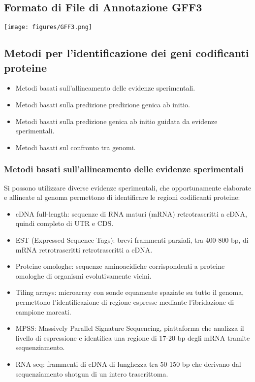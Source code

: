\documentclass{article}
\begin{document}
\subsection{Formato di File di Annotazione GFF3}
\begin{center}
    \texttt{[image: figures/GFF3.png]}
\end{center}
\subsection{Metodi per l'identificazione dei geni codificanti proteine}
\begin{itemize}
    \item Metodi basati sull'allineamento delle evidenze sperimentali.
    \item Metodi basati sulla predizione predizione genica ab
    initio.
    \item Metodi basati sulla predizione genica ab
    initio guidata da evidenze sperimentali.
    \item Metodi basati sul confronto tra genomi.
\end{itemize}

\subsubsection{Metodi basati sull'allineamento delle evidenze sperimentali}
Si possono utilizzare diverse evidenze sperimentali, che
opportunamente elaborate e allineate al genoma
permettono di identificare le regioni codificanti proteine:
\begin{itemize}
    \item cDNA full-length: sequenze di RNA maturi (mRNA)
    retrotrascritti a cDNA, quindi completo di UTR e CDS.
    \item EST (Expressed Sequence Tags): brevi frammenti parziali, tra
    400-800 bp, di mRNA retrotrascritti retrotrascritti a cDNA. 
    \item Proteine omologhe: sequenze aminoacidiche corrispondenti a
    proteine omologhe di organismi evolutivamente vicini.
    \item Tiling arrays: microarray con sonde equamente spaziate su
    tutto il genoma, permettono l'identificazione di regione
    espresse mediante l'ibridazione di campione marcati.
    \item MPSS: Massively Parallel Signature Sequencing, piattaforma
    che analizza il livello di espressione e identifica una regione di
    17-20 bp degli mRNA tramite sequenziamento.
    \item RNA-seq: frammenti di cDNA di lunghezza tra 50-150 bp che
    derivano dal sequenziamento shotgun di un intero trascrittoma.
\end{itemize}
\end{document}
